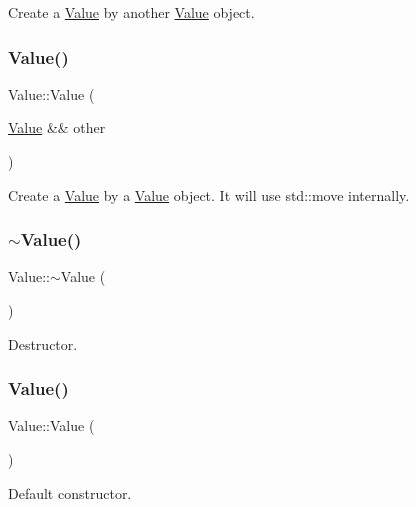 Create a \hyperlink{classValue}{Value} by another \hyperlink{classValue}{Value} object. \mbox{\label{classValue_a787430959f5652852d4ea01daa512341}} 
\subsubsection{\texorpdfstring{Value()}{Value()}\hspace{0.1cm}{\footnotesize\ttfamily [17/34]}}
{\footnotesize\ttfamily Value\+::\+Value (\begin{DoxyParamCaption}\item[{\hyperlink{classValue}{Value} \&\&}]{other }\end{DoxyParamCaption})}

Create a \hyperlink{classValue}{Value} by a \hyperlink{classValue}{Value} object. It will use std\+::move internally. \mbox{\label{classValue_a3a578f458da8a4ab67052dba0f7bffdd}} 
\subsubsection{\texorpdfstring{$\sim$\+Value()}{~Value()}\hspace{0.1cm}{\footnotesize\ttfamily [1/2]}}
{\footnotesize\ttfamily Value\+::$\sim$\+Value (\begin{DoxyParamCaption}{ }\end{DoxyParamCaption})}

Destructor. \mbox{\label{classValue_abc2a5a2e6484fac66dae2539cc955667}} 
\subsubsection{\texorpdfstring{Value()}{Value()}\hspace{0.1cm}{\footnotesize\ttfamily [18/34]}}
{\footnotesize\ttfamily Value\+::\+Value (\begin{DoxyParamCaption}{ }\end{DoxyParamCaption})}

Default constructor. \mbox{\label{classValue_aabe730986b0548c9de3e52ea086e6b8c}} 
